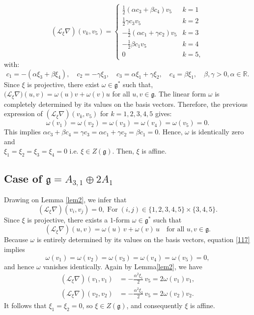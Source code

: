 \documentclass[10pt]{article}
\begin{document}
\[
(\mathscr{L}_\xi\nabla)(v_k,v_5)=
\begin{cases} 
\tfrac{1}{2}(\alpha c_3+ \beta c_4) v_5 & k=1 \\ 
\tfrac{1}{2}\gamma c_3 v_5 & k=2 \\ 
-\tfrac{1}{2}(\alpha c_1 + \gamma c_2) v_5 & k=3 \\ 
-\tfrac{1}{2}\beta c_1 v_5 & k=4\\
0&k=5,
\end{cases}
\] with: \[
c_1 = -(\alpha\xi_3 + \beta\xi_4), \quad
c_2 = -\gamma\xi_3, \quad
c_3 = \alpha\xi_1 + \gamma\xi_2, \quad
c_4 = \beta\xi_1,\quad \beta, \gamma > 0, \alpha \in \mathbb{R}.
\]
Since $\xi$ is projective, there exist $\omega\in\mathfrak{g}^*$ such that, $\big(\mathscr{L}_\xi\nabla\big)(u,v)=\omega(u)v+\omega(v)u$ for all $u,v\in \mathfrak{g}.$ The linear form $\omega$
is completely determined by its values on the basis vectors. Therefore, the previous expression of $(\mathscr{L}_\xi\nabla)(v_k,v_5)$ for $k=1,2,3,4,5$ gives:
$$\omega(v_1)=\omega(v_2)=\omega(v_3)=\omega(v_4)=\omega(v_5)=0.$$ This implies $\alpha c_3+ \beta c_4=\gamma c_3=\alpha c_1 + \gamma c_2=\beta c_1=0.$ Hence, $\omega$ is identically zero and\\ $\xi_1=\xi_2=\xi_3=\xi_4=0$ i.e. $\xi\in Z(\mathfrak{g}).$ Then, $\xi$ is affine. 

\subsection{Case of $\mathfrak{g}=A_{3,1}\oplus 2A_1$}
Drawing on Lemma \ref{lem2}, we infer that
\begin{equation}\label{117} (\mathscr{L}_\xi\nabla)(v_i,v_j)=0,\; \text{For}\; (i, j)\in \{1,2,3,4,5\}\times\{3,4,5\}. \end{equation}
Since \(\xi\) is projective, there exists a $1$-form \(\omega \in \mathfrak{g}^*\) such that
\[
(\mathscr{L}_\xi \nabla)(u,v) = \omega(u)\,v + \omega(v)\,u
\quad \text{for all } u, v \in \mathfrak{g}.
\]
Because \(\omega\) is entirely determined by its values on the basis vectors, equation \eqref{117} implies
\[
\omega(v_1) = \omega(v_2) = \omega(v_3) = \omega(v_4) = \omega(v_5) = 0,
\]
and hence \(\omega\) vanishes identically.  
Again by Lemma\ref{lem2}, we have
\begin{align*}
(\mathscr{L}_\xi \nabla)(v_1,v_1) &= -\tfrac{\alpha^2 \xi_1}{2}\,v_5=2\omega(v_1)v_1, \\
(\mathscr{L}_\xi \nabla)(v_2,v_2) &= -\tfrac{\alpha^2 \xi_2}{2}\,v_5=2\omega(v_2)v_2.
\end{align*}
It follows that \(\xi_1 = \xi_2 = 0\), so \(\xi \in Z(\mathfrak{g})\), and consequently \(\xi\) is affine.
\end{document}
